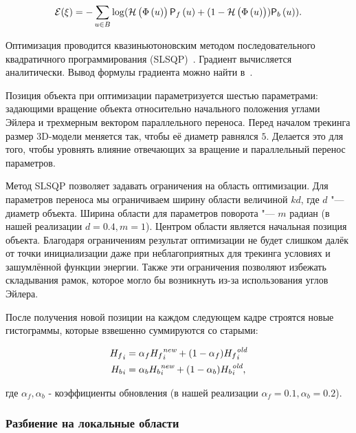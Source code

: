 \begin{equation}
\label{eqn:err_func}
\mathcal{E}(\xi) = - \sum\limits_{\mathnormal{u} \in B}
\log(\mathcal{H} \left( \Phi \left( \mathnormal{u} \right) \right) \mathsf{P}_f \left( \mathnormal{u} \right) + (1 - \mathcal{H} \left( \Phi \left( \mathnormal{u} \right) \right))\mathsf{P}_b \left( \mathnormal{u} \right))
\text{.}
\end{equation}

Оптимизация проводится квазиньютоновским методом последовательного
квадратичного программирования (SLSQP)~\cite{SLSQP}.
Градиент вычисляется аналитически.
Вывод формулы градиента можно найти в~\cite{Tjaden2018}.

Позиция объекта при оптимизации параметризуется шестью параметрами:
задающими вращение объекта относительно начального положения углами Эйлера
и трехмерным вектором параллельного переноса.
Перед началом трекинга размер 3D-модели меняется так, чтобы её диаметр равнялся
$5$.
Делается это для того, чтобы уровнять влияние отвечающих за вращение и
параллельный перенос параметров.

Метод SLSQP позволяет задавать ограничения на область оптимизации.
Для параметров переноса мы ограничиваем ширину области величиной $kd$,
где $d$ "--- диаметр объекта.
Ширина области для параметров поворота "--- $m$ радиан (в нашей реализации $d
=0.4, m = 1$).
Центром области является начальная позиция объекта.
Благодаря ограничениям результат оптимизации не будет слишком далёк от точки
инициализации даже при неблагоприятных для трекинга условиях и зашумлённой
функции энергии.
Также эти ограничения позволяют избежать складывания рамок, которое
могло бы возникнуть из-за использования углов Эйлера.

После получения новой позиции на каждом следующем кадре строятся новые
гистограммы, которые взвешенно суммируются со старыми:

\begin{align}
{\ensuremath{H_f}}_i &= \alpha_f {H_f}_i^{\text{\it new}} + (1 - \alpha_f)
{H_f}_i^{\text{\it old}} \\{H_b}_i &= \alpha_b
{H_b}_i^{\text{\it new}} + (1 - \alpha_b) {H_b}_i^{\text{\it
old}}\text{,}
\end{align}

где $\alpha_f, \alpha_b$ - коэффициенты обновления (в нашей реализации
$\alpha_f = 0.1, \alpha_b = 0.2$).

\subsubsection*{Разбиение на локальные области}

